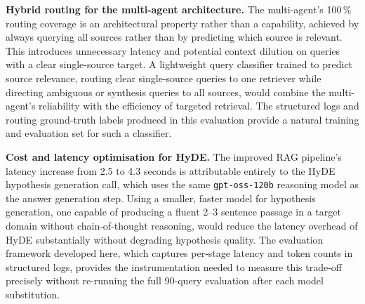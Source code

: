 \textbf{Hybrid routing for the multi-agent architecture.} The multi-agent's 100\,\% routing coverage is an architectural property rather than a capability, achieved by always querying all sources rather than by predicting which source is relevant. This introduces unnecessary latency and potential context dilution on queries with a clear single-source target. A lightweight query classifier trained to predict source relevance, routing clear single-source queries to one retriever while directing ambiguous or synthesis queries to all sources, would combine the multi-agent's reliability with the efficiency of targeted retrieval. The structured logs and routing ground-truth labels produced in this evaluation provide a natural training and evaluation set for such a classifier.

\textbf{Cost and latency optimisation for HyDE.} The improved RAG pipeline's latency increase from 2.5 to 4.3 seconds is attributable entirely to the HyDE hypothesis generation call, which uses the same \texttt{gpt-oss-120b} reasoning model as the answer generation step. Using a smaller, faster model for hypothesis generation, one capable of producing a fluent 2--3 sentence passage in a target domain without chain-of-thought reasoning, would reduce the latency overhead of HyDE substantially without degrading hypothesis quality. The evaluation framework developed here, which captures per-stage latency and token counts in structured logs, provides the instrumentation needed to measure this trade-off precisely without re-running the full 90-query evaluation after each model substitution.
